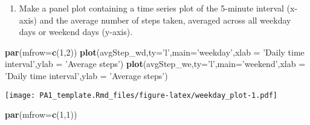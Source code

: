 \documentclass[
]{article}
\newenvironment{Shaded}{\begin{snugshade}}{\end{snugshade}}
\newcommand{\DataTypeTok}[1]{\textcolor[rgb]{0.13,0.29,0.53}{#1}}
\newcommand{\DecValTok}[1]{\textcolor[rgb]{0.00,0.00,0.81}{#1}}
\newcommand{\KeywordTok}[1]{\textcolor[rgb]{0.13,0.29,0.53}{\textbf{#1}}}
\newcommand{\NormalTok}[1]{#1}
\newcommand{\StringTok}[1]{\textcolor[rgb]{0.31,0.60,0.02}{#1}}
\providecommand{\tightlist}{%
  \setlength{\itemsep}{0pt}\setlength{\parskip}{0pt}}
\begin{document}
\begin{enumerate}
\def\labelenumi{\arabic{enumi}.}
\setcounter{enumi}{1}
\tightlist
\item
  Make a panel plot containing a time series plot of the 5-minute
  interval (x-axis) and the average number of steps taken, averaged
  across all weekday days or weekend days (y-axis).
\end{enumerate}

\begin{Shaded}
\begin{Highlighting}[]
\KeywordTok{par}\NormalTok{(}\DataTypeTok{mfrow=}\KeywordTok{c}\NormalTok{(}\DecValTok{1}\NormalTok{,}\DecValTok{2}\NormalTok{))}
\KeywordTok{plot}\NormalTok{(avgStep_wd,}\DataTypeTok{ty=}\StringTok{'l'}\NormalTok{,}\DataTypeTok{main=}\StringTok{'weekday'}\NormalTok{,}\DataTypeTok{xlab =} \StringTok{'Daily time interval'}\NormalTok{,}\DataTypeTok{ylab =} \StringTok{'Average steps'}\NormalTok{)}
\KeywordTok{plot}\NormalTok{(avgStep_we,}\DataTypeTok{ty=}\StringTok{'l'}\NormalTok{,}\DataTypeTok{main=}\StringTok{'weekend'}\NormalTok{,}\DataTypeTok{xlab =} \StringTok{'Daily time interval'}\NormalTok{,}\DataTypeTok{ylab =} \StringTok{'Average steps'}\NormalTok{)}
\end{Highlighting}
\end{Shaded}

\texttt{[image: PA1\_template.Rmd\_files/figure-latex/weekday\_plot-1.pdf]}

\begin{Shaded}
\begin{Highlighting}[]
\KeywordTok{par}\NormalTok{(}\DataTypeTok{mfrow=}\KeywordTok{c}\NormalTok{(}\DecValTok{1}\NormalTok{,}\DecValTok{1}\NormalTok{))}
\end{Highlighting}
\end{Shaded}
\end{document}
